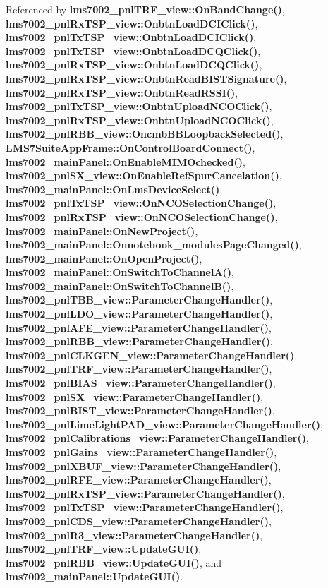 Referenced by {\bf lms7002\+\_\+pnl\+T\+R\+F\+\_\+view\+::\+On\+Band\+Change()}, {\bf lms7002\+\_\+pnl\+Rx\+T\+S\+P\+\_\+view\+::\+Onbtn\+Load\+D\+C\+I\+Click()}, {\bf lms7002\+\_\+pnl\+Tx\+T\+S\+P\+\_\+view\+::\+Onbtn\+Load\+D\+C\+I\+Click()}, {\bf lms7002\+\_\+pnl\+Tx\+T\+S\+P\+\_\+view\+::\+Onbtn\+Load\+D\+C\+Q\+Click()}, {\bf lms7002\+\_\+pnl\+Rx\+T\+S\+P\+\_\+view\+::\+Onbtn\+Load\+D\+C\+Q\+Click()}, {\bf lms7002\+\_\+pnl\+Rx\+T\+S\+P\+\_\+view\+::\+Onbtn\+Read\+B\+I\+S\+T\+Signature()}, {\bf lms7002\+\_\+pnl\+Rx\+T\+S\+P\+\_\+view\+::\+Onbtn\+Read\+R\+S\+S\+I()}, {\bf lms7002\+\_\+pnl\+Tx\+T\+S\+P\+\_\+view\+::\+Onbtn\+Upload\+N\+C\+O\+Click()}, {\bf lms7002\+\_\+pnl\+Rx\+T\+S\+P\+\_\+view\+::\+Onbtn\+Upload\+N\+C\+O\+Click()}, {\bf lms7002\+\_\+pnl\+R\+B\+B\+\_\+view\+::\+Oncmb\+B\+B\+Loopback\+Selected()}, {\bf L\+M\+S7\+Suite\+App\+Frame\+::\+On\+Control\+Board\+Connect()}, {\bf lms7002\+\_\+main\+Panel\+::\+On\+Enable\+M\+I\+M\+Ochecked()}, {\bf lms7002\+\_\+pnl\+S\+X\+\_\+view\+::\+On\+Enable\+Ref\+Spur\+Cancelation()}, {\bf lms7002\+\_\+main\+Panel\+::\+On\+Lms\+Device\+Select()}, {\bf lms7002\+\_\+pnl\+Tx\+T\+S\+P\+\_\+view\+::\+On\+N\+C\+O\+Selection\+Change()}, {\bf lms7002\+\_\+pnl\+Rx\+T\+S\+P\+\_\+view\+::\+On\+N\+C\+O\+Selection\+Change()}, {\bf lms7002\+\_\+main\+Panel\+::\+On\+New\+Project()}, {\bf lms7002\+\_\+main\+Panel\+::\+Onnotebook\+\_\+modules\+Page\+Changed()}, {\bf lms7002\+\_\+main\+Panel\+::\+On\+Open\+Project()}, {\bf lms7002\+\_\+main\+Panel\+::\+On\+Switch\+To\+Channel\+A()}, {\bf lms7002\+\_\+main\+Panel\+::\+On\+Switch\+To\+Channel\+B()}, {\bf lms7002\+\_\+pnl\+T\+B\+B\+\_\+view\+::\+Parameter\+Change\+Handler()}, {\bf lms7002\+\_\+pnl\+L\+D\+O\+\_\+view\+::\+Parameter\+Change\+Handler()}, {\bf lms7002\+\_\+pnl\+A\+F\+E\+\_\+view\+::\+Parameter\+Change\+Handler()}, {\bf lms7002\+\_\+pnl\+R\+B\+B\+\_\+view\+::\+Parameter\+Change\+Handler()}, {\bf lms7002\+\_\+pnl\+C\+L\+K\+G\+E\+N\+\_\+view\+::\+Parameter\+Change\+Handler()}, {\bf lms7002\+\_\+pnl\+T\+R\+F\+\_\+view\+::\+Parameter\+Change\+Handler()}, {\bf lms7002\+\_\+pnl\+B\+I\+A\+S\+\_\+view\+::\+Parameter\+Change\+Handler()}, {\bf lms7002\+\_\+pnl\+S\+X\+\_\+view\+::\+Parameter\+Change\+Handler()}, {\bf lms7002\+\_\+pnl\+B\+I\+S\+T\+\_\+view\+::\+Parameter\+Change\+Handler()}, {\bf lms7002\+\_\+pnl\+Lime\+Light\+P\+A\+D\+\_\+view\+::\+Parameter\+Change\+Handler()}, {\bf lms7002\+\_\+pnl\+Calibrations\+\_\+view\+::\+Parameter\+Change\+Handler()}, {\bf lms7002\+\_\+pnl\+Gains\+\_\+view\+::\+Parameter\+Change\+Handler()}, {\bf lms7002\+\_\+pnl\+X\+B\+U\+F\+\_\+view\+::\+Parameter\+Change\+Handler()}, {\bf lms7002\+\_\+pnl\+R\+F\+E\+\_\+view\+::\+Parameter\+Change\+Handler()}, {\bf lms7002\+\_\+pnl\+Rx\+T\+S\+P\+\_\+view\+::\+Parameter\+Change\+Handler()}, {\bf lms7002\+\_\+pnl\+Tx\+T\+S\+P\+\_\+view\+::\+Parameter\+Change\+Handler()}, {\bf lms7002\+\_\+pnl\+C\+D\+S\+\_\+view\+::\+Parameter\+Change\+Handler()}, {\bf lms7002\+\_\+pnl\+R3\+\_\+view\+::\+Parameter\+Change\+Handler()}, {\bf lms7002\+\_\+pnl\+T\+R\+F\+\_\+view\+::\+Update\+G\+U\+I()}, {\bf lms7002\+\_\+pnl\+R\+B\+B\+\_\+view\+::\+Update\+G\+U\+I()}, and {\bf lms7002\+\_\+main\+Panel\+::\+Update\+G\+U\+I()}.



